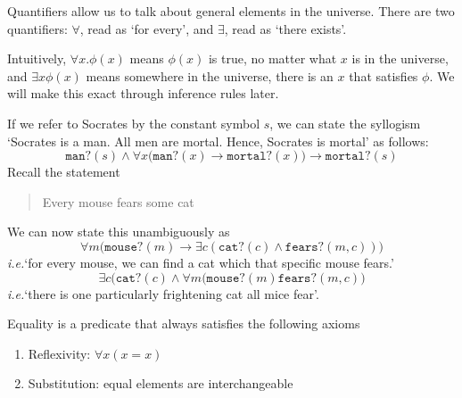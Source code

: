 \documentclass{scrbook}
\renewcommand{\implies}{\to}
\renewcommand{\iff}{\leftrightarrow}
\newcommand{\ie}{\emph{i.e.}\xspace}
\begin{document}
\begin{defn}[quantifier]
  Quantifiers allow us to talk about general elements in the universe. There are two quantifiers: $\forall$, read as `for every', and $\exists$, read as `there exists'.

  Intuitively, $\forall x .\phi(x)$ means $\phi(x)$ is true, no matter what $x$ is in the universe, and $\exists x \phi(x)$ means somewhere in the universe, there is an $x$ that satisfies $\phi$. We will make this exact through inference rules later.
\end{defn}
If we refer to Socrates by the constant symbol $s$, we can state the syllogism `Socrates is a man. All men are mortal. Hence, Socrates is mortal' as follows:
\[
\texttt{man?}(s) \wedge \forall x \bigl(\texttt{man?}(x)\implies\texttt{mortal?}(x)\bigr) \implies \texttt{mortal?}(s)
\] 
Recall the statement
\begin{quote}
  Every mouse fears some cat
\end{quote}
We can now state this unambiguously as 
\[
\forall m \bigr(\texttt{mouse?}(m) \implies \exists c (\texttt{cat?}(c)\wedge \texttt{fears?}(m,c)) \bigl)
\]
\ie `for every mouse, we can find a cat which that specific mouse fears.'
\[
\exists c \bigl(\texttt{cat?}(c) \wedge \forall m (\texttt{mouse?}(m) \texttt{fears?}(m,c)\bigr)
\]
\ie `there is one particularly frightening cat all mice fear'.

\begin{defn}[equality]
  Equality is a predicate that always satisfies the following axioms
  \begin{enumerate}
  \item Reflexivity: $\forall x (x=x)$
  \item Substitution: equal elements are interchangeable 
  \end{enumerate}
\end{defn}
\end{document}
